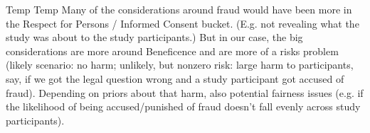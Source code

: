 \begin{outline}

\1 Temp
\2 Temp
\3 Many of the considerations around fraud would have been more in the Respect for Persons / Informed Consent bucket.  (E.g. not revealing what the study was about to the study participants.)  But in our case, the big considerations are more around Beneficence and are more of a risks problem (likely scenario: no harm; unlikely, but nonzero risk: large harm to participants, say, if we got the legal question wrong and a study participant got accused of fraud).  Depending on priors about that harm, also potential fairness issues (e.g. if the likelihood of being accused/punished of fraud doesn’t fall evenly across study participants).

\end{outline}
